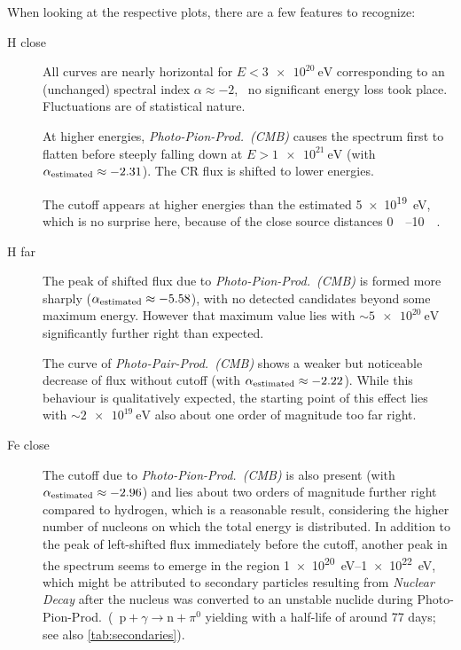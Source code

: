 When looking at the respective plots, there are a few features to recognize:
\begin{description}
    \item[H close]
        All curves are nearly horizontal for $E<\SI{3e20}{\electronvolt}$
        corresponding to an (unchanged) spectral index $\alpha\approx-2$,
        \ie~no significant energy loss took place. Fluctuations are of
        statistical nature.

        At higher energies, \emph{Photo-Pion-Prod.~(CMB)} causes the
        spectrum first to flatten before steeply falling down at
        $E>\SI{1e21}{\electronvolt}$ (with $\alpha_{\mathrm{estimated}}\approx-2.31$). The CR
        flux is shifted to lower energies.

        The cutoff appears at higher energies than the estimated
        \SI{5e19}{\electronvolt}, which is no surprise here, because of the
        close source distances \SIrange{0}{10}{\mega\parsec}.

    \item[H far]
        The peak of shifted flux due to \emph{Photo-Pion-Prod.~(CMB)} is formed
        more sharply ($\alpha_{\mathrm{estimated}}\approx-5.58$), with no
        detected candidates beyond some maximum energy. However that maximum
        value lies with $\sim\SI{5e20}{\electronvolt}$ significantly further
        right than expected.

        The curve of \emph{Photo-Pair-Prod.~(CMB)} shows a weaker but
        noticeable decrease of flux without cutoff (with
        $\alpha_{\mathrm{estimated}}\approx-2.22$). While this behaviour is
        qualitatively expected, the starting point of this effect lies with
        $\sim\SI{2e19}{\electronvolt}$ also about one order of magnitude too
        far right.

    \item[Fe close]
        The cutoff due to \emph{Photo-Pion-Prod.~(CMB)} is also present (with
        $\alpha_{\mathrm{estimated}}\approx-2.96$) and
        lies about two orders of magnitude further right compared to hydrogen,
        which is a reasonable result, considering the higher number of
        nucleons on which the total energy is distributed. In addition to
        the peak of left-shifted flux immediately before the cutoff,
        another peak in the spectrum seems to emerge in the region
        \SIrange{1e20}{1e22}{\electronvolt}, which might be attributed to
        secondary particles resulting from \emph{Nuclear Decay} after the
        nucleus was converted to an unstable nuclide during
        Photo-Pion-Prod.~(\eg~${\text{p}+\gamma\to\text{n}+\pi^0}$ yielding
         with a half-life of around 77 days; see also
        \cref{tab:secondaries}).


\end{description}

